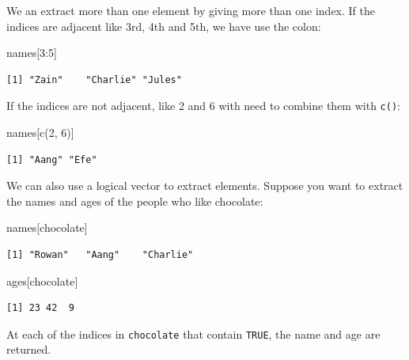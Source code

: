 \documentclass[
  letterpaper,
  DIV=11,
  numbers=noendperiod]{scrreprt}
\newenvironment{Shaded}{\begin{snugshade}}{\end{snugshade}}
\newcommand{\DecValTok}[1]{\textcolor[rgb]{0.68,0.00,0.00}{#1}}
\newcommand{\FunctionTok}[1]{\textcolor[rgb]{0.28,0.35,0.67}{#1}}
\newcommand{\NormalTok}[1]{\textcolor[rgb]{0.00,0.23,0.31}{#1}}
\newcommand{\SpecialCharTok}[1]{\textcolor[rgb]{0.37,0.37,0.37}{#1}}
\begin{document}
We an extract more than one element by giving more than one index. If
the indices are adjacent like 3rd, 4th and 5th, we have use the colon:

\begin{Shaded}
\begin{Highlighting}[]
\NormalTok{names[}\DecValTok{3}\SpecialCharTok{:}\DecValTok{5}\NormalTok{]}
\end{Highlighting}
\end{Shaded}

\begin{verbatim}
[1] "Zain"    "Charlie" "Jules"  
\end{verbatim}

If the indices are not adjacent, like 2 and 6 with need to combine them
with \texttt{c()}:

\begin{Shaded}
\begin{Highlighting}[]
\NormalTok{names[}\FunctionTok{c}\NormalTok{(}\DecValTok{2}\NormalTok{, }\DecValTok{6}\NormalTok{)]}
\end{Highlighting}
\end{Shaded}

\begin{verbatim}
[1] "Aang" "Efe" 
\end{verbatim}

We can also use a logical vector to extract elements. Suppose you want
to extract the names and ages of the people who like chocolate:

\begin{Shaded}
\begin{Highlighting}[]
\NormalTok{names[chocolate]}
\end{Highlighting}
\end{Shaded}

\begin{verbatim}
[1] "Rowan"   "Aang"    "Charlie"
\end{verbatim}

\begin{Shaded}
\begin{Highlighting}[]
\NormalTok{ages[chocolate]}
\end{Highlighting}
\end{Shaded}

\begin{verbatim}
[1] 23 42  9
\end{verbatim}

At each of the indices in \texttt{chocolate} that contain \texttt{TRUE},
the name and age are returned.
\end{document}

